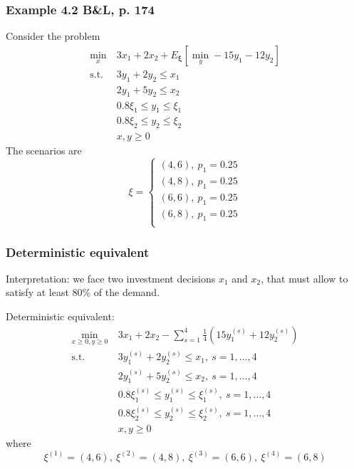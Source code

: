 \documentclass{beamer}
\def\bxi{\boldsymbol\xi}
\begin{document}
\begin{frame}
\frametitle{Example 4.2 B\&L, p. 174}

Consider the problem
\begin{align*}
	\min_x\ & 3x_1 + 2x_2 + E_{\bxi}[\min_y -15y_1-12y_2] \\
	\mbox{s.t. } & 3y_1 + 2y_2 \leq x_1 \\
	& 2y_1 + 5y_2 \leq x_2 \\
	& 0.8 \xi_1 \leq y_1 \leq \xi_1 \\
	& 0.8 \xi_2 \leq y_2 \leq \xi_2 \\
	& x, y \geq 0
\end{align*}
The scenarios are
\[
\xi =
\begin{cases}
(4,6),\ p_1 = 0.25 \\
(4,8),\ p_1 = 0.25 \\
(6,6),\ p_1 = 0.25 \\
(6,8),\ p_1 = 0.25 \\
\end{cases}
\]

\end{frame}

\begin{frame}
\frametitle{Deterministic equivalent}

{\red Interpretation}: we face two investment decisions $x_1$ and $x_2$,
that must allow to satisfy at least 80\% of the demand.

{\red Deterministic equivalent}:
\begin{align*}
\min_{x \geq 0, y \geq 0}\ & 3x_1 + 2x_2 - \sum_{s = 1}^4 \frac{1}{4} \left( 15y^{(s)}_1+12y^{(s)}_2 \right) \\
\mbox{s.t. } & 3y^{(s)}_1 + 2y^{(s)}_2 \leq x_1,\ s = 1,\ldots,4 \\
& 2y^{(s)}_1 + 5y^{(s)}_2 \leq x_2,\ s = 1,\ldots,4 \\
& 0.8 \xi^{(s)}_1 \leq y^{(s)}_1 \leq \xi^{(s)}_1,\ s = 1,\ldots,4 \\
& 0.8 \xi^{(s)}_2 \leq y^{(s)}_2 \leq \xi^{(s)}_2,\ s = 1,\ldots,4 \\
& x, y \geq 0
\end{align*}
where
$$
\xi^{(1)} = (4,6),\ 
\xi^{(2)} = (4,8), \
\xi^{(3)} = (6,6),\ 
\xi^{(4)} = (6,8)
$$

\end{frame}
\end{document}
